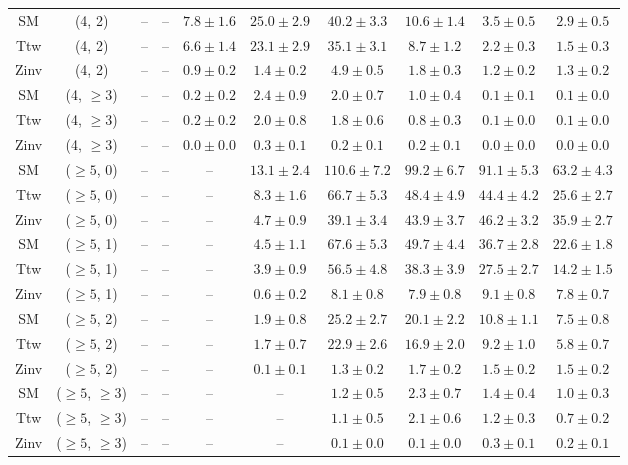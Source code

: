 \begin{table}[h!]
{\begin{tabular}{cccccccccc}
	SM & (4, 2) & -- & -- & $7.8\pm 1.6$ & $25.0\pm 2.9$ & $40.2\pm 3.3$ & $10.6\pm 1.4$ & $3.5\pm 0.5$ & $2.9\pm 0.5$ \\[0.5ex] 
	Ttw & (4, 2) & -- & -- & $6.6\pm 1.4$ & $23.1\pm 2.9$ & $35.1\pm 3.1$ & $8.7\pm 1.2$ & $2.2\pm 0.3$ & $1.5\pm 0.3$ \\[0.5ex] 
	Zinv & (4, 2) & -- & -- & $0.9\pm 0.2$ & $1.4\pm 0.2$ & $4.9\pm 0.5$ & $1.8\pm 0.3$ & $1.2\pm 0.2$ & $1.3\pm 0.2$ \\[0.5ex] 
	SM & (4, $\ge3$) & -- & -- & $0.2\pm 0.2$ & $2.4\pm 0.9$ & $2.0\pm 0.7$ & $1.0\pm 0.4$ & $0.1\pm 0.1$ & $0.1\pm 0.0$ \\[0.5ex] 
	Ttw & (4, $\ge3$) & -- & -- & $0.2\pm 0.2$ & $2.0\pm 0.8$ & $1.8\pm 0.6$ & $0.8\pm 0.3$ & $0.1\pm 0.0$ & $0.1\pm 0.0$ \\[0.5ex] 
	Zinv & (4, $\ge3$) & -- & -- & $0.0\pm 0.0$ & $0.3\pm 0.1$ & $0.2\pm 0.1$ & $0.2\pm 0.1$ & $0.0\pm 0.0$ & $0.0\pm 0.0$ \\[0.5ex] 
	SM & ($\ge5$, 0) & -- & -- & -- & $13.1\pm 2.4$ & $110.6\pm 7.2$ & $99.2\pm 6.7$ & $91.1\pm 5.3$ & $63.2\pm 4.3$ \\[0.5ex] 
	Ttw & ($\ge5$, 0) & -- & -- & -- & $8.3\pm 1.6$ & $66.7\pm 5.3$ & $48.4\pm 4.9$ & $44.4\pm 4.2$ & $25.6\pm 2.7$ \\[0.5ex] 
	Zinv & ($\ge5$, 0) & -- & -- & -- & $4.7\pm 0.9$ & $39.1\pm 3.4$ & $43.9\pm 3.7$ & $46.2\pm 3.2$ & $35.9\pm 2.7$ \\[0.5ex] 
	SM & ($\ge5$, 1) & -- & -- & -- & $4.5\pm 1.1$ & $67.6\pm 5.3$ & $49.7\pm 4.4$ & $36.7\pm 2.8$ & $22.6\pm 1.8$ \\[0.5ex] 
	Ttw & ($\ge5$, 1) & -- & -- & -- & $3.9\pm 0.9$ & $56.5\pm 4.8$ & $38.3\pm 3.9$ & $27.5\pm 2.7$ & $14.2\pm 1.5$ \\[0.5ex] 
	Zinv & ($\ge5$, 1) & -- & -- & -- & $0.6\pm 0.2$ & $8.1\pm 0.8$ & $7.9\pm 0.8$ & $9.1\pm 0.8$ & $7.8\pm 0.7$ \\[0.5ex] 
	SM & ($\ge5$, 2) & -- & -- & -- & $1.9\pm 0.8$ & $25.2\pm 2.7$ & $20.1\pm 2.2$ & $10.8\pm 1.1$ & $7.5\pm 0.8$ \\[0.5ex] 
	Ttw & ($\ge5$, 2) & -- & -- & -- & $1.7\pm 0.7$ & $22.9\pm 2.6$ & $16.9\pm 2.0$ & $9.2\pm 1.0$ & $5.8\pm 0.7$ \\[0.5ex] 
	Zinv & ($\ge5$, 2) & -- & -- & -- & $0.1\pm 0.1$ & $1.3\pm 0.2$ & $1.7\pm 0.2$ & $1.5\pm 0.2$ & $1.5\pm 0.2$ \\[0.5ex] 
	SM & ($\ge5$, $\ge3$) & -- & -- & -- & -- & $1.2\pm 0.5$ & $2.3\pm 0.7$ & $1.4\pm 0.4$ & $1.0\pm 0.3$ \\[0.5ex] 
	Ttw & ($\ge5$, $\ge3$) & -- & -- & -- & -- & $1.1\pm 0.5$ & $2.1\pm 0.6$ & $1.2\pm 0.3$ & $0.7\pm 0.2$ \\[0.5ex] 
	Zinv & ($\ge5$, $\ge3$) & -- & -- & -- & -- & $0.1\pm 0.0$ & $0.1\pm 0.0$ & $0.3\pm 0.1$ & $0.2\pm 0.1$ \\[0.5ex] 
	\hline
	\hline
\end{tabular}}
\end{table}
